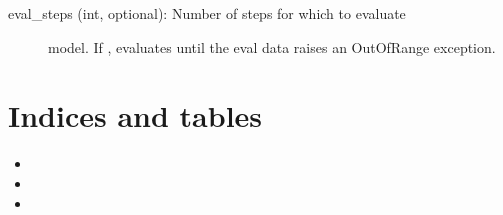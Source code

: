 \documentclass[letterpaper,10pt,english]{sphinxmanual}
\begin{document}
\begin{fulllineitems}
\begin{fulllineitems}
\begin{description}
\begin{description}
\item[{eval\_steps (int, optional): Number of steps for which to evaluate}] \leavevmode
model. If , evaluates until the eval data raises an
OutOfRange exception.

\end{description}

\end{description}

\end{fulllineitems}


\end{fulllineitems}



\chapter{Indices and tables}
\label{\detokenize{index:indices-and-tables}}\begin{itemize}
\item {} 

\item {} 

\item {} 

\end{itemize}


\renewcommand{\indexname}{Python Module Index}
\begin{sphinxtheindex}
\let\bigletter\sphinxstyleindexlettergroup
\bigletter{s}
\item\relax{}
\end{sphinxtheindex}

\renewcommand{\indexname}{Index}
\printindex
\end{document}
